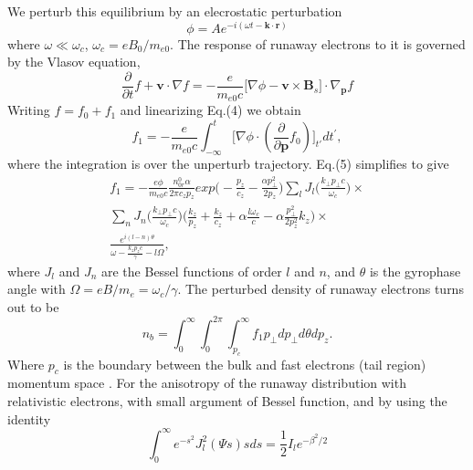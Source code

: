 \documentclass[aip,pop,amsmath,amssymb,showpacs,reprint,floatfix,lengthcheck]{revtex4-1}
\begin{document}
We perturb this equilibrium by an elecrostatic perturbation
\begin{equation}
 \phi=A e^{-i(\omega t-\textbf{k}\cdot\textbf{r})}
\end{equation}
where $\omega\ll\omega_{c}$, $\omega_{c}=eB_{0}/m_{e0}$. The response of runaway electrons to it is governed by the Vlasov equation,
 \begin{equation}
 \frac{\partial}{\partial t}f+\textbf{v}\cdot\nabla f= -\frac{e}{m_{e0}c}\biggl[\nabla\phi-\textbf{v}\times \textbf{B}_{s}\biggr]\cdot \nabla_{\textbf{p}} f
\end{equation}
Writing $f=f_{0}+f_{1}$ and linearizing Eq.(4) we obtain
\begin{equation}
 f_{1}=-\frac{e}{m_{e0}c}\int^{t}_{-\infty} \biggl[\nabla\phi \cdot(\frac{\partial}{\partial \textbf{p}}f_{0})\biggr]_{t{'}}    dt^{'},
\end{equation}
where the integration is over the unperturb trajectory.
 Eq.(5) simplifies to give 
\begin{eqnarray}
f_{1}=-\frac{e\phi }{m_{e0}c}\frac{n_{0r}^{0} \alpha}{2\pi c_{z}p_{z}}exp\biggl(-\frac{p_{z}}{c_{z}}-\frac{\alpha p_{\perp}^2}{2p_{z}}\biggr) \sum_{l} J_{l}\biggl(\frac{k_{\perp}p_{\perp}c}{\omega_{c}}\biggr)\times\nonumber\\
\sum_{n} J_{n}\biggl(\frac{k_{\perp}p_{\perp}c}{\omega_{c}}\biggr)\biggl(\frac{k_{z}}{p_{z}}+\frac{k_{z}}{c_{z}}+\alpha\frac{l\omega_{c}}{c}-\alpha\frac{p_{\perp}^2}{2p_{z}^2}k_{z}\biggr)\times\nonumber\\
\frac{e^{i(l-n)\theta}}{\omega-\frac{k_{z} p_{z}c}{\gamma}-l\Omega},\quad\quad
\end{eqnarray}
where $J_{l}$ and $J_{n}$ are the Bessel functions of order $l$ and $n$, and $\theta$ is the gyrophase angle with $\Omega=eB/m_{e}=\omega_{c}/\gamma$. The perturbed density of  runaway electrons  turns out to be
\begin{equation}
 n_{b}=\int_0 ^{\infty} \int_0 ^{2\pi} \int_{p_{c}} ^{\infty} f_{1} p_{\perp} dp_{\perp} d\theta dp_{z}.
\end{equation}
Where $p_{c}$ is the boundary between the bulk and fast electrons (tail region) momentum space \cite{eriksson2003simulation}. For the anisotropy of the runaway distribution with relativistic electrons, with small argument of Bessel function, and by using the identity
\begin{equation}
 \int_{0}^{\infty} e^{-s^2}J_{l}^{2}(\Psi s) s ds=\frac{1}{2} I_{l}e^{-{\beta}^2/2}
\end{equation}
\end{document}
